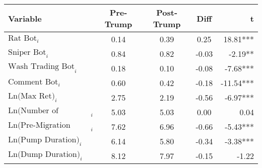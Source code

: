 \begin{tabular}{lcccr}
\hline
Variable & Pre-Trump & Post-Trump & Diff & t \\
\hline
$\text{Rat Bot}_{i}$ & 0.14 & 0.39 & 0.25 & 18.81*** \\
$\text{Sniper Bot}_{i}$ & 0.84 & 0.82 & -0.03 & -2.19** \\
$\text{Wash Trading Bot}_{i}$ & 0.18 & 0.10 & -0.08 & -7.68*** \\
$\text{Comment Bot}_{i}$ & 0.60 & 0.42 & -0.18 & -11.54*** \\
$\text{Ln(Max Ret)}_{i}$ & 2.75 & 2.19 & -0.56 & -6.97*** \\
$\text{Ln(Number of Traders)}_{i}$ & 5.03 & 5.03 & 0.00 & 0.04 \\
$\text{Ln(Pre-Migration Duration)}_{i}$ & 7.62 & 6.96 & -0.66 & -5.43*** \\
$\text{Ln(Pump Duration)}_{i}$ & 6.14 & 5.80 & -0.34 & -3.38*** \\
$\text{Ln(Dump Duration)}_{i}$ & 8.12 & 7.97 & -0.15 & -1.22 \\
\hline
\end{tabular}